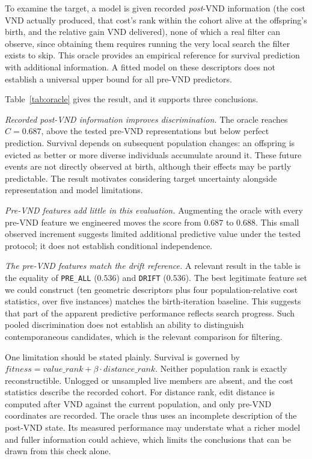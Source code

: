 \documentclass[a4paper,fleqn]{cas-dc}
\begin{document}
To examine the target, a model is given recorded \emph{post}-VND information
(the cost VND actually produced, that cost's rank within the cohort alive at the
offspring's birth, and the relative gain VND delivered), none of which a real
filter can observe, since obtaining them requires running the very local search
the filter exists to skip. This oracle provides an empirical reference for
survival prediction with additional information. A fitted model on these
descriptors does not establish a universal upper bound for all pre-VND predictors.

Table~\ref{tab:oracle} gives the result, and it supports three conclusions.

\emph{Recorded post-VND information improves discrimination.} The oracle reaches
$C = 0.687$, above the tested pre-VND representations but below perfect
prediction. Survival depends on subsequent population changes: an offspring is
evicted as better or more diverse individuals accumulate around it. These future
events are not directly observed at birth, although their effects may be partly
predictable. The result motivates considering target uncertainty alongside
representation and model limitations.

\emph{Pre-VND features add little in this evaluation.} Augmenting the oracle with
every pre-VND feature we engineered moves the score from $0.687$ to $0.688$.
This small observed increment suggests limited additional predictive value under
the tested protocol; it does not establish conditional independence.

\emph{The pre-VND features match the drift reference.} A relevant result in the
table is the equality of \texttt{PRE\_ALL} ($0.536$) and \texttt{DRIFT}
($0.536$). The best legitimate feature set we could construct (ten geometric
descriptors plus four population-relative cost statistics, over five instances)
matches the birth-iteration baseline. This suggests that part of the apparent
predictive performance reflects search progress. Such pooled discrimination does
not establish an ability to distinguish contemporaneous candidates, which is
the relevant comparison for filtering.

One limitation should be stated plainly. Survival is governed by
$\textit{fitness} = \textit{value\_rank} + \beta \cdot \textit{distance\_rank}$.
Neither population rank is exactly reconstructible. Unlogged or unsampled
live members are absent, and the cost statistics describe the recorded cohort.
For distance rank, edit distance is computed after VND against the
current population, and only pre-VND coordinates are recorded. The oracle thus
uses an incomplete description of the post-VND state. Its measured performance
may understate what a richer model and fuller information could achieve, which
limits the conclusions that can be drawn from this check alone.
\end{document}
